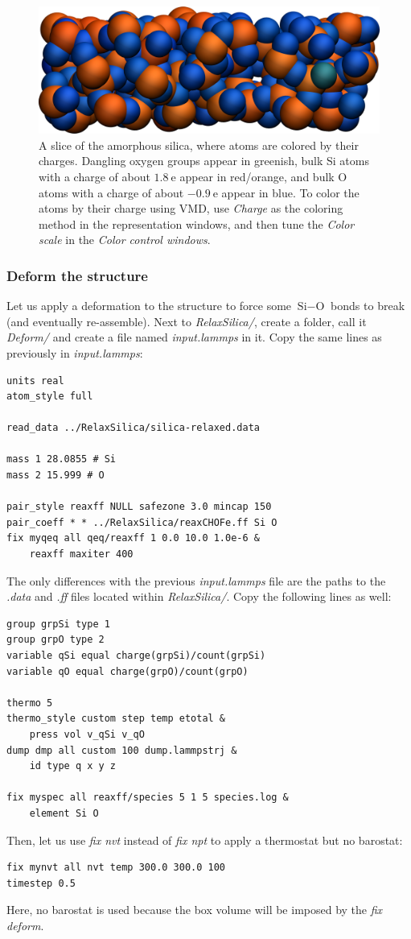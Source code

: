 \documentclass[9pt,tutorial]{livecoms}
\begin{document}
\begin{figure}
\includegraphics[width=\linewidth]{SIO-slice}
\caption{A slice of the amorphous silica, where atoms are colored by their charges. Dangling oxygen groups appear in greenish, bulk Si atoms with a charge of about $1.8~\text{e}$  appear in red/orange, and bulk O atoms with a charge of about $-0.9~\text{e}$ appear in blue. To color the atoms by their charge using VMD, use \textit{Charge} as the coloring method in the representation windows, and then tune the \textit{Color scale} in the \textit{Color control windows}.}
\label{fig:SIO-slice}
\end{figure}

\subsubsection{Deform the structure}
Let us apply a deformation to the structure to force some $\text{Si}-\text{O}$ bonds to break (and eventually re-assemble). Next to \textit{RelaxSilica/}, create a folder, call it \textit{Deform/} and create a file named \textit{input.lammps} in it. Copy the same lines as previously in \textit{input.lammps}:
{\normalsize \begin{verbatim}
units real
atom_style full

read_data ../RelaxSilica/silica-relaxed.data

mass 1 28.0855 # Si
mass 2 15.999 # O

pair_style reaxff NULL safezone 3.0 mincap 150
pair_coeff * * ../RelaxSilica/reaxCHOFe.ff Si O
fix myqeq all qeq/reaxff 1 0.0 10.0 1.0e-6 &
    reaxff maxiter 400
\end{verbatim}}
The only differences with the previous \textit{input.lammps} file are the paths to the \textit{.data} and \textit{.ff} files located within \textit{RelaxSilica/}. Copy the following lines as well:
{\normalsize \begin{verbatim}
group grpSi type 1
group grpO type 2
variable qSi equal charge(grpSi)/count(grpSi)
variable qO equal charge(grpO)/count(grpO)

thermo 5
thermo_style custom step temp etotal &
    press vol v_qSi v_qO
dump dmp all custom 100 dump.lammpstrj &
    id type q x y z

fix myspec all reaxff/species 5 1 5 species.log &
    element Si O
\end{verbatim}}
Then, let us use \textit{fix nvt} instead of \textit{fix npt} to apply a thermostat but no barostat:
{\normalsize \begin{verbatim}
fix mynvt all nvt temp 300.0 300.0 100
timestep 0.5
\end{verbatim}}
Here, no barostat is used because the box volume will be imposed by the \textit{fix deform}.
\end{document}
